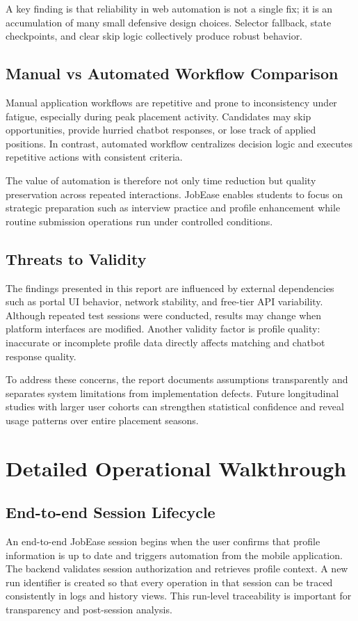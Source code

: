\documentclass[12pt,a4paper,oneside]{report}
\begin{document}
A key finding is that reliability in web automation is not a single fix; it is an accumulation of many small defensive design choices. Selector fallback, state checkpoints, and clear skip logic collectively produce robust behavior.

\section{Manual vs Automated Workflow Comparison}
Manual application workflows are repetitive and prone to inconsistency under fatigue, especially during peak placement activity. Candidates may skip opportunities, provide hurried chatbot responses, or lose track of applied positions. In contrast, automated workflow centralizes decision logic and executes repetitive actions with consistent criteria.

The value of automation is therefore not only time reduction but quality preservation across repeated interactions. JobEase enables students to focus on strategic preparation such as interview practice and profile enhancement while routine submission operations run under controlled conditions.

\section{Threats to Validity}
The findings presented in this report are influenced by external dependencies such as portal UI behavior, network stability, and free-tier API variability. Although repeated test sessions were conducted, results may change when platform interfaces are modified. Another validity factor is profile quality: inaccurate or incomplete profile data directly affects matching and chatbot response quality.

To address these concerns, the report documents assumptions transparently and separates system limitations from implementation defects. Future longitudinal studies with larger user cohorts can strengthen statistical confidence and reveal usage patterns over entire placement seasons.

\chapter{Detailed Operational Walkthrough}
\section{End-to-end Session Lifecycle}
An end-to-end JobEase session begins when the user confirms that profile information is up to date and triggers automation from the mobile application. The backend validates session authorization and retrieves profile context. A new run identifier is created so that every operation in that session can be traced consistently in logs and history views. This run-level traceability is important for transparency and post-session analysis.
\end{document}
